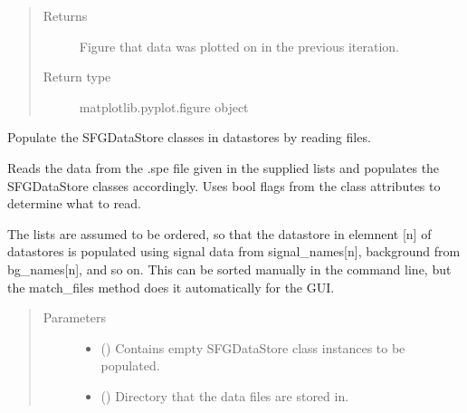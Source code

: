 \documentclass[a4paper,10pt,english]{sphinxmanual}
\begin{document}
\begin{fulllineitems}
\begin{fulllineitems}
\begin{quote}
\begin{description}
\begin{itemize}
\end{itemize}

\item[{Returns}] \leavevmode
\sphinxAtStartPar
{} \textendash{} Figure that data was plotted on in the previous iteration.

\item[{Return type}] \leavevmode
\sphinxAtStartPar
matplotlib.pyplot.figure object

\end{description}\end{quote}

\end{fulllineitems}


\begin{fulllineitems}
\label{\detokenize{sfgtools:sfgtools.SFGProcessTools.populate_data_stores}}
\sphinxAtStartPar
Populate the SFGDataStore classes in datastores by reading files.

\sphinxAtStartPar
Reads the data from the .spe file given in the supplied lists and populates the SFGDataStore
classes accordingly. Uses bool flags from the class attributes to determine what to read.

\sphinxAtStartPar
The lists are assumed to be ordered, so that the datastore in elemnent {[}n{]} of datastores is
populated using signal data from signal\_names{[}n{]}, background from bg\_names{[}n{]}, and so on. This
can be sorted manually in the command line, but the match\_files method does it automatically for
the GUI.
\begin{quote}\begin{description}
\item[{Parameters}] \leavevmode\begin{itemize}
\item {} 
\sphinxAtStartPar
{} () \textendash{} Contains empty SFGDataStore class instances to be populated.

\item {} 
\sphinxAtStartPar
{} () \textendash{} Directory that the data files are stored in.


\end{itemize}
\end{description}
\end{quote}
\end{fulllineitems}
\end{fulllineitems}
\end{document}
